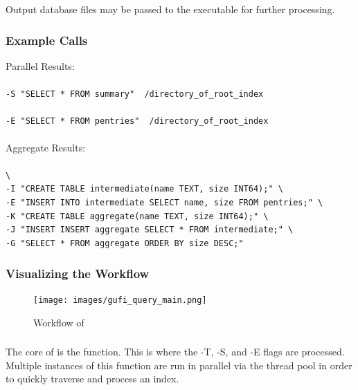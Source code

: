 Output database files may be passed to the \querydbs executable for
further processing.

\subsubsection{Example Calls}

\noindent Parallel Results:
\\\\
\indent \gufiquery \texttt{-S "SELECT * FROM summary"
  ~/directory\_of\_root\_index}
\\\\
\indent \gufiquery \texttt{-E "SELECT * FROM pentries"
  ~/directory\_of\_root\_index}
\\\\
\noindent Aggregate Results:
\\\\
\indent \gufiquery \texttt{\textbackslash} \\
\indent \texttt{-I "CREATE TABLE intermediate(name TEXT, size INT64);" \textbackslash} \\
\indent \texttt{-E "INSERT INTO intermediate SELECT name, size FROM pentries;" \textbackslash} \\
\indent \texttt{-K "CREATE TABLE aggregate(name TEXT, size INT64);" \textbackslash} \\
\indent \texttt{-J "INSERT INSERT aggregate SELECT * FROM intermediate;" \textbackslash} \\
\indent \texttt{-G "SELECT * FROM aggregate ORDER BY size DESC;"} \\

\subsubsection{Visualizing the Workflow}
\begin{figure} [H]
  \centering
  \texttt{[image: images/gufi\_query\_main.png]}
  \caption{Workflow of \gufiquery}
\end{figure}

\subsubsection{\processdir}
The core of \gufiquery is the \processdir function. This is where the
-T, -S, and -E flags are processed. Multiple instances of this
function are run in parallel via the thread pool in order to quickly
traverse and process an index.

